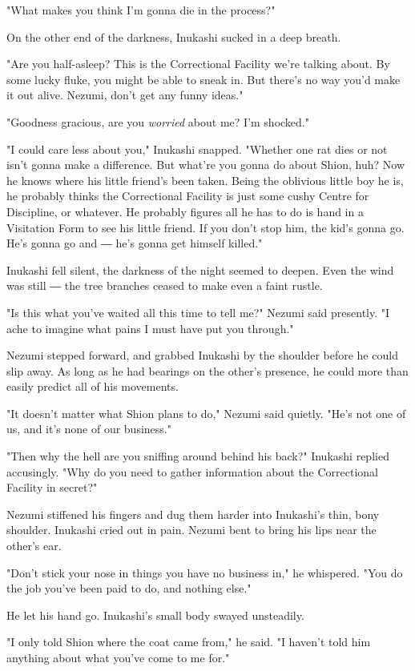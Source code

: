 "What makes you think I'm gonna die in the process?"

On the other end of the darkness, Inukashi sucked in a deep breath.

"Are you half-asleep? This is the Correctional Facility we're talking
about. By some lucky fluke, you might be able to sneak in. But there's
no way you'd make it out alive. Nezumi, don't get any funny ideas."

"Goodness gracious, are you \emph{worried} about me? I'm shocked."

"I could care less about you," Inukashi snapped. "Whether one rat dies
or not isn't gonna make a difference. But what're you gonna do about
Shion, huh? Now he knows where his little friend's been taken. Being the
oblivious little boy he is, he probably thinks the Correctional Facility
is just some cushy Centre for Discipline, or whatever. He probably
figures all he has to do is hand in a Visitation Form to see his little
friend. If you don't stop him, the kid's gonna go. He's gonna go and ―
he's gonna get himself killed."

Inukashi fell silent, the darkness of the night seemed to deepen. Even
the wind was still ― the tree branches ceased to make even a faint
rustle.

"Is this what you've waited all this time to tell me?" Nezumi said
presently. "I ache to imagine what pains I must have put you through."

Nezumi stepped forward, and grabbed Inukashi by the shoulder before he
could slip away. As long as he had bearings on the other's presence, he
could more than easily predict all of his movements.

"It doesn't matter what Shion plans to do," Nezumi said quietly. "He's
not one of us, and it's none of our business."

"Then why the hell are you sniffing around behind his back?" Inukashi
replied accusingly. "Why do you need to gather information about the
Correctional Facility in secret?"

Nezumi stiffened his fingers and dug them harder into Inukashi's thin,
bony shoulder. Inukashi cried out in pain. Nezumi bent to bring his lips
near the other's ear.

"Don't stick your nose in things you have no business in," he whispered.
"You do the job you've been paid to do, and nothing else."

He let his hand go. Inukashi's small body swayed unsteadily.

"I only told Shion where the coat came from," he said. "I haven't told
him anything about what you've come to me for."

